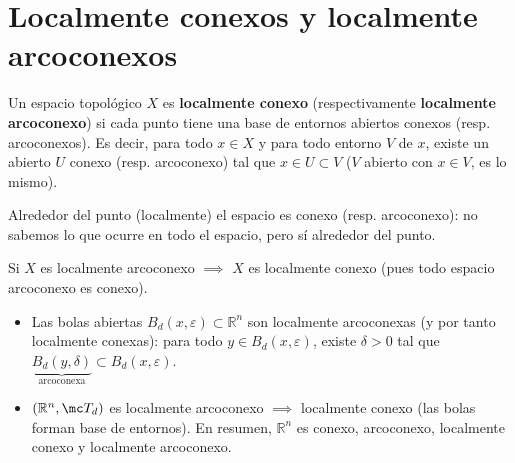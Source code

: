 \section{Localmente conexos y localmente arcoconexos}

\begin{defi}
Un espacio topológico $X$ es \textbf{localmente conexo} (respectivamente \textbf{localmente arcoconexo}) si cada punto tiene una base de entornos abiertos conexos (resp. arcoconexos). Es decir, para todo $x \in X$ y para todo entorno $V$ de $x$, existe un abierto $U$ conexo (resp. arcoconexo) tal que $x \in U \subset V$ ($V$ abierto con $x \in V$, es lo mismo).

\begin{center}
\end{center}

Alrededor del punto (localmente) el espacio es conexo (resp. arcoconexo): no sabemos lo que ocurre en todo el espacio, pero sí alrededor del punto.

Si $X$ es localmente arcoconexo $\implies$ $X$ es localmente conexo (pues todo espacio arcoconexo es conexo).
\end{defi}

\begin{ejems}
\begin{itemize}
    \item Las bolas abiertas $B_d(x, \varepsilon) \subset \mathbb{R}^n$ son localmente arcoconexas (y por tanto localmente conexas): para todo $y \in B_d(x, \varepsilon)$, existe $\delta > 0$ tal que $\underbrace{B_d(y, \delta)}_{\text{arcoconexa}} \subset B_d(x, \varepsilon)$.
    \item $(\mathbb{R}^n,\mc T_d)$ es localmente arcoconexo $\implies$ localmente conexo (las bolas forman base de entornos). En resumen, $\mathbb{R}^n$ es conexo, arcoconexo, localmente conexo y localmente arcoconexo.
\end{itemize}
\end{ejems}

